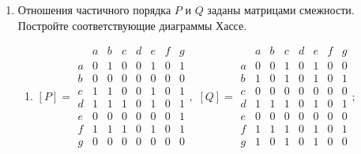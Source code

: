 \begin{enumerate}
    \item Отношения частичного порядка $P$ и $Q$ заданы матрицами смежности. Постройте соответствующие диаграммы Хассе.
    \begin{enumerate}
        \item 
        \(
            [P]=
            \begin{array}{c|ccccccc}
                 &a&b&c&d&e&f&g\\ \hline
                a&0&1&0&0&1&0&1\\
                b&0&0&0&0&0&0&0\\
                c&1&1&0&0&1&0&1\\
                d&1&1&1&0&1&0&1\\
                e&0&0&0&0&0&0&1\\
                f&1&1&1&0&1&0&1\\
                g&0&0&0&0&0&0&0
            \end{array},
        \)
        \(
            [Q]=
            \begin{array}{c|ccccccc}
                 &a&b&c&d&e&f&g\\ \hline
                a&0&0&1&0&1&0&0\\
                b&1&0&1&0&1&0&1\\
                c&0&0&0&0&0&0&0\\
                d&1&1&1&0&1&0&1\\
                e&0&0&0&0&0&0&0\\
                f&1&1&1&0&1&0&1\\
                g&1&0&1&0&1&0&0
            \end{array};
        \)
        

\end{enumerate}
\end{enumerate}

